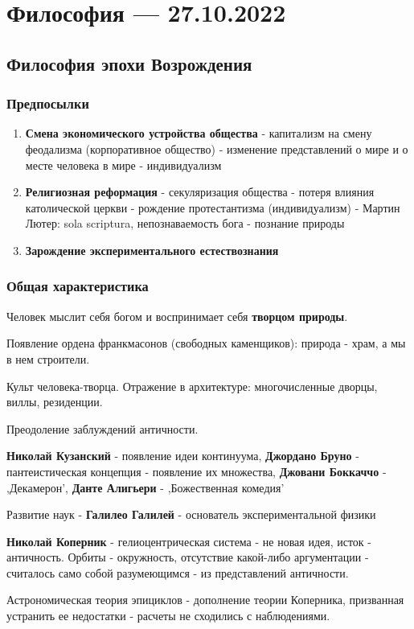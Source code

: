 \documentclass{article}
\begin{document}
\pagebreak
\section{Философия — 27.10.2022}

\subsection{Философия эпохи Возрождения}

\begin{flushleft}

\subsubsection{Предпосылки}

\begin{enumerate}
    \item \textbf{Смена экономического устройства общества} - капитализм на смену феодализма (корпоративное общество) - изменение представлений о мире и о месте человека в мире - индивидуализм
    \item \textbf{Религиозная реформация} - секуляризация общества - потеря влияния католической церкви - рождение протестантизма (индивидуализм) - Мартин Лютер: sola scriptura, непознаваемость бога - познание природы
    \item \textbf{Зарождение экспериментального естествознания}
\end{enumerate}

\subsubsection{Общая характеристика}

Человек мыслит себя богом и воспринимает себя \textbf{творцом природы}.

Появление ордена франкмасонов (свободных каменщиков): природа - храм, а мы в нем строители.

Культ человека-творца. Отражение в архитектуре: многочисленные дворцы, виллы, резиденции.

Преодоление заблуждений античности.

\hfill

\textbf{Николай Кузанский} - появление идеи континуума, \textbf{Джордано Бруно} - пантеистическая концепция - появление их множества, \textbf{Джовани Боккаччо} - ,Декамерон', \textbf{Данте Алигьери} - ,Божественная комедия'

Развитие наук - \textbf{Галилео Галилей} - основатель экспериментальной физики

\textbf{Николай Коперник} - гелиоцентрическая система - не новая идея, исток - античность. Орбиты - окружность, отсутствие какой-либо аргументации - считалось само собой разумеющимся - из представлений античности.

Астрономическая теория эпициклов - дополнение теории Коперника, призванная устранить ее недостатки - расчеты не сходились с наблюдениями.

\end{flushleft}
\end{document}
